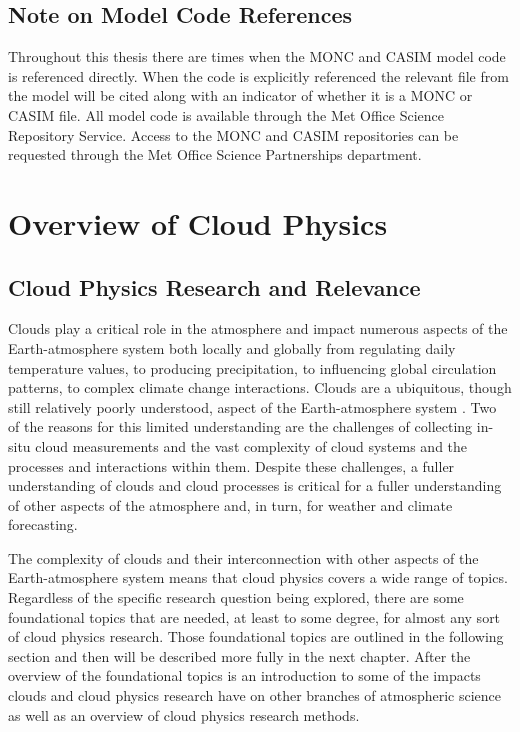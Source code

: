 \section{Note on Model Code References}
Throughout this thesis there are times when the MONC and CASIM model code is referenced directly. When the code is explicitly referenced the relevant file from the model will be cited along with an indicator of whether it is a MONC or CASIM file. All model code is available through the Met Office Science Repository Service. Access to the MONC and CASIM repositories can be requested through the Met Office Science Partnerships department.

\chapter{Overview of Cloud Physics} \label{ch:cloudPhys}
\section{Cloud Physics Research and Relevance}
Clouds play a critical role in the atmosphere and impact numerous aspects of the Earth-atmosphere system both locally and globally from regulating daily temperature values, to producing precipitation, to influencing global circulation patterns, to complex climate change interactions. Clouds are a ubiquitous, though still relatively poorly understood, aspect of the Earth-atmosphere system \citep{mur2012,ipcc5,mcfa2017,milt2018-2}. Two of the reasons for this limited understanding are the challenges of collecting in-situ cloud measurements and the vast complexity of cloud systems and the processes and interactions within them. Despite these challenges, a fuller understanding of clouds and cloud processes is critical for a fuller understanding of other aspects of the atmosphere and, in turn, for weather and climate forecasting.

The complexity of clouds and their interconnection with other aspects of the Earth-atmosphere system means that cloud physics covers a wide range of topics. Regardless of the specific research question being explored, there are some foundational topics that are needed, at least to some degree, for almost any sort of cloud physics research. Those foundational topics are outlined in the following section and then will be described more fully in the next chapter. After the overview of the foundational topics is an introduction to some of the impacts clouds and cloud physics research have on other branches of atmospheric science as well as an overview of cloud physics research methods.

